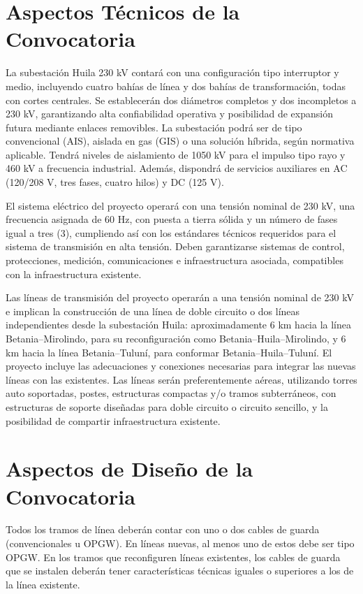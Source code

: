 \section*{Aspectos Técnicos de la Convocatoria}
La subestación Huila 230 kV contará con una configuración tipo interruptor y medio, incluyendo cuatro bahías de línea y dos bahías de transformación, todas con cortes centrales. Se establecerán dos diámetros completos y dos incompletos a 230 kV, garantizando alta confiabilidad operativa y posibilidad de expansión futura mediante enlaces removibles. La subestación podrá ser de tipo convencional (AIS), aislada en gas (GIS) o una solución híbrida, según normativa aplicable. Tendrá niveles de aislamiento de 1050 kV para el impulso tipo rayo y 460 kV a frecuencia industrial. Además, dispondrá de servicios auxiliares en AC (120/208 V, tres fases, cuatro hilos) y DC (125 V).

El sistema eléctrico del proyecto operará con una tensión nominal de 230 kV, una frecuencia asignada de 60 Hz, con puesta a tierra sólida y un número de fases igual a tres (3), cumpliendo así con los estándares técnicos requeridos para el sistema de transmisión en alta tensión. Deben garantizarse sistemas de control, protecciones, medición, comunicaciones e infraestructura asociada, compatibles con la infraestructura existente.

Las líneas de transmisión del proyecto operarán a una tensión nominal de 230 kV e implican la construcción de una línea de doble circuito o dos líneas independientes desde la subestación Huila: aproximadamente 6 km hacia la línea Betania–Mirolindo, para su reconfiguración como Betania–Huila–Mirolindo, y 6 km hacia la línea Betania–Tuluní, para conformar Betania–Huila–Tuluní. El proyecto incluye las adecuaciones y conexiones necesarias para integrar las nuevas líneas con las existentes. Las líneas serán preferentemente aéreas, utilizando torres auto soportadas, postes, estructuras compactas y/o tramos subterráneos, con estructuras de soporte diseñadas para doble circuito o circuito sencillo, y la posibilidad de compartir infraestructura existente.
\section*{Aspectos de Diseño de la Convocatoria}

Todos los tramos de línea deberán contar con uno o dos cables de guarda (convencionales u OPGW). En líneas nuevas, al menos uno de estos debe ser tipo OPGW. En los tramos que reconfiguren líneas existentes, los cables de guarda que se instalen deberán tener características técnicas iguales o superiores a los de la línea existente.

